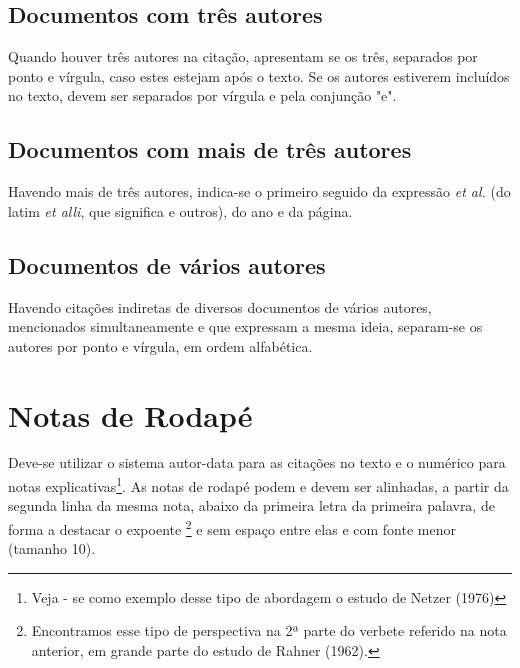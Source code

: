 \subsection{Documentos com três autores}

Quando houver três autores na citação, apresentam se os três, separados por ponto e vírgula, caso estes estejam após o texto. Se os autores estiverem incluídos no texto, devem ser separados por vírgula e pela conjunção "e".


\cite{tresautores}

\subsection{Documentos com mais de três autores}
Havendo mais de três autores, indica-se o primeiro seguido da expressão \textit{et al.} (do latim \textit{et alli}, que significa e outros), do ano e da página.


\cite{quatroautores}

\subsection{Documentos de vários autores}

Havendo    citações    indiretas de    diversos    documentos    de    vários    autores, mencionados  simultaneamente e  que  expressam  a  mesma  ideia,  separam-se  os  autores  por ponto e vírgula, em ordem alfabética.

\cite{tresautores, quatroautores}

\section{Notas de Rodap\'{e}}

Deve-se utilizar o sistema autor-data para as  citações no texto e o numérico para notas explicativas\footnote{Veja - se como exemplo desse tipo de abordagem o estudo de Netzer (1976)}. As notas de rodapé podem e devem ser alinhadas, a partir da segunda linha da mesma nota, abaixo da primeira letra da primeira palavra, de forma a destacar o expoente \footnote{Encontramos  esse  tipo  de  perspectiva  na  2ª  parte  do  verbete  referido  na  nota  anterior,  em  grande  parte  do estudo de Rahner (1962).} e sem espaço entre elas e com fonte menor (tamanho 10).

